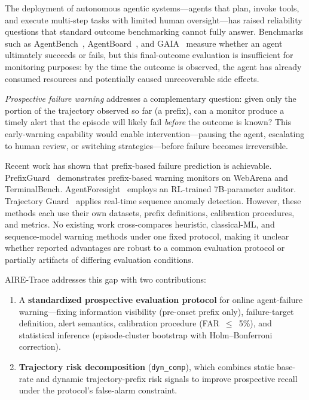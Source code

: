 \documentclass[conference,letterpaper]{IEEEtran}
\begin{document}
The deployment of autonomous agentic systems---agents that plan, invoke
tools, and execute multi-step tasks with limited human oversight---has
raised reliability questions that standard outcome benchmarking cannot
fully answer. Benchmarks such as AgentBench~\cite{b1},
AgentBoard~\cite{b2}, and GAIA~\cite{b3} measure whether an agent
ultimately succeeds or fails, but this final-outcome evaluation is
insufficient for monitoring purposes: by the time the outcome is
observed, the agent has already consumed resources and potentially caused
unrecoverable side effects.

\textit{Prospective failure warning} addresses a complementary question:
given only the portion of the trajectory observed so far (a prefix), can
a monitor produce a timely alert that the episode will likely fail
\textit{before} the outcome is known? This early-warning capability
would enable intervention---pausing the agent, escalating to human
review, or switching strategies---before failure becomes irreversible.

Recent work has shown that prefix-based failure prediction is
achievable. PrefixGuard~\cite{b7} demonstrates prefix-based warning
monitors on WebArena and TerminalBench. AgentForesight~\cite{b8} employs
an RL-trained 7B-parameter auditor. Trajectory Guard~\cite{b9} applies
real-time sequence anomaly detection. However, these methods each use
their own datasets, prefix definitions, calibration procedures, and
metrics. No existing work cross-compares heuristic, classical-ML, and
sequence-model warning methods under one fixed protocol, making it
unclear whether reported advantages are robust to a common evaluation
protocol or partially artifacts of differing evaluation conditions.

AIRE-Trace addresses this gap with two contributions:
\begin{enumerate}
\item A \textbf{standardized prospective evaluation protocol} for online
      agent-failure warning---fixing information visibility (pre-onset
      prefix only), failure-target definition, alert semantics,
      calibration procedure (FAR~$\leq$~5\%), and statistical inference
      (episode-cluster bootstrap with Holm--Bonferroni correction).
\item \textbf{Trajectory risk decomposition} (\texttt{dyn\_comp}), which
      combines static base-rate and dynamic trajectory-prefix risk
      signals to improve prospective recall under the protocol's
      false-alarm constraint.
\end{enumerate}
\end{document}
